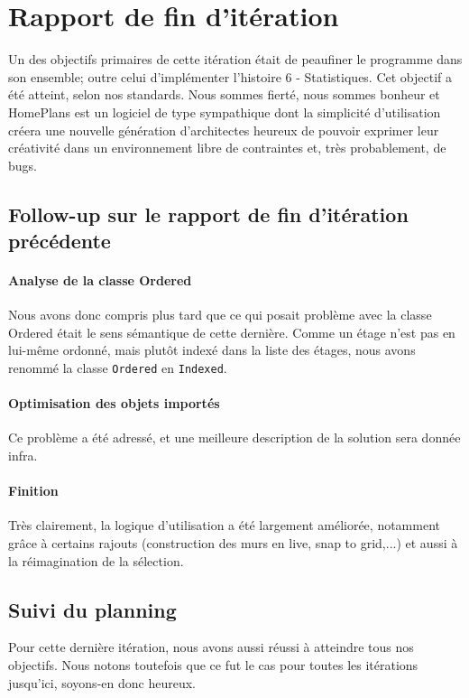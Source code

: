 \section{Rapport de fin d'itération}
Un des objectifs primaires de cette itération était de peaufiner le programme 
dans son ensemble; outre celui d'implémenter l'histoire 6 - Statistiques.
Cet objectif a été atteint, selon nos standards. Nous sommes fierté, nous sommes
bonheur et HomePlans est un logiciel de type sympathique dont la simplicité
d'utilisation créera une nouvelle génération d'architectes heureux de pouvoir
exprimer leur créativité dans un environnement libre de contraintes et, très
probablement, de bugs.

\subsection{Follow-up sur le rapport de fin d'itération précédente}

	\paragraph{Analyse de la classe Ordered}
	Nous avons donc compris plus tard que ce qui posait problème avec la classe
	Ordered était le sens sémantique de cette dernière. Comme un étage n'est pas
	en lui-même ordonné, mais plutôt indexé dans la liste des étages, nous avons
	renommé la classe \texttt{Ordered} en \texttt{Indexed}.

	\paragraph{Optimisation des objets importés}
	Ce problème a été adressé, et une meilleure description de la solution sera
	donnée infra.
	
	\paragraph{Finition}
	Très clairement, la logique d'utilisation a été largement améliorée, notamment
	grâce à certains rajouts (construction des murs en live, snap to grid,...) et
	aussi à la réimagination de la sélection.
	

\subsection{Suivi du planning}
Pour cette dernière itération, nous avons aussi réussi à atteindre tous nos 
objectifs. Nous notons toutefois que ce fut le cas pour toutes les itérations
jusqu'ici, soyons-en donc heureux.

